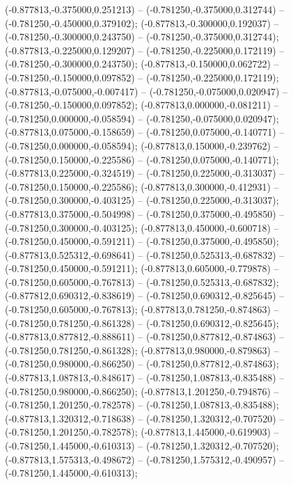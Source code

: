  (-0.877813,-0.375000,0.251213) -- (-0.781250,-0.375000,0.312744) -- (-0.781250,-0.450000,0.379102);
 (-0.877813,-0.300000,0.192037) -- (-0.781250,-0.300000,0.243750) -- (-0.781250,-0.375000,0.312744);
 (-0.877813,-0.225000,0.129207) -- (-0.781250,-0.225000,0.172119) -- (-0.781250,-0.300000,0.243750);
 (-0.877813,-0.150000,0.062722) -- (-0.781250,-0.150000,0.097852) -- (-0.781250,-0.225000,0.172119);
 (-0.877813,-0.075000,-0.007417) -- (-0.781250,-0.075000,0.020947) -- (-0.781250,-0.150000,0.097852);
 (-0.877813,0.000000,-0.081211) -- (-0.781250,0.000000,-0.058594) -- (-0.781250,-0.075000,0.020947);
 (-0.877813,0.075000,-0.158659) -- (-0.781250,0.075000,-0.140771) -- (-0.781250,0.000000,-0.058594);
 (-0.877813,0.150000,-0.239762) -- (-0.781250,0.150000,-0.225586) -- (-0.781250,0.075000,-0.140771);
 (-0.877813,0.225000,-0.324519) -- (-0.781250,0.225000,-0.313037) -- (-0.781250,0.150000,-0.225586);
 (-0.877813,0.300000,-0.412931) -- (-0.781250,0.300000,-0.403125) -- (-0.781250,0.225000,-0.313037);
 (-0.877813,0.375000,-0.504998) -- (-0.781250,0.375000,-0.495850) -- (-0.781250,0.300000,-0.403125);
 (-0.877813,0.450000,-0.600718) -- (-0.781250,0.450000,-0.591211) -- (-0.781250,0.375000,-0.495850);
 (-0.877813,0.525312,-0.698641) -- (-0.781250,0.525313,-0.687832) -- (-0.781250,0.450000,-0.591211);
 (-0.877813,0.605000,-0.779878) -- (-0.781250,0.605000,-0.767813) -- (-0.781250,0.525313,-0.687832);
 (-0.877812,0.690312,-0.838619) -- (-0.781250,0.690312,-0.825645) -- (-0.781250,0.605000,-0.767813);
 (-0.877813,0.781250,-0.874863) -- (-0.781250,0.781250,-0.861328) -- (-0.781250,0.690312,-0.825645);
 (-0.877813,0.877812,-0.888611) -- (-0.781250,0.877812,-0.874863) -- (-0.781250,0.781250,-0.861328);
 (-0.877813,0.980000,-0.879863) -- (-0.781250,0.980000,-0.866250) -- (-0.781250,0.877812,-0.874863);
 (-0.877813,1.087813,-0.848617) -- (-0.781250,1.087813,-0.835488) -- (-0.781250,0.980000,-0.866250);
 (-0.877813,1.201250,-0.794876) -- (-0.781250,1.201250,-0.782578) -- (-0.781250,1.087813,-0.835488);
 (-0.877813,1.320312,-0.718638) -- (-0.781250,1.320312,-0.707520) -- (-0.781250,1.201250,-0.782578);
 (-0.877813,1.445000,-0.619903) -- (-0.781250,1.445000,-0.610313) -- (-0.781250,1.320312,-0.707520);
 (-0.877813,1.575313,-0.498672) -- (-0.781250,1.575312,-0.490957) -- (-0.781250,1.445000,-0.610313);
